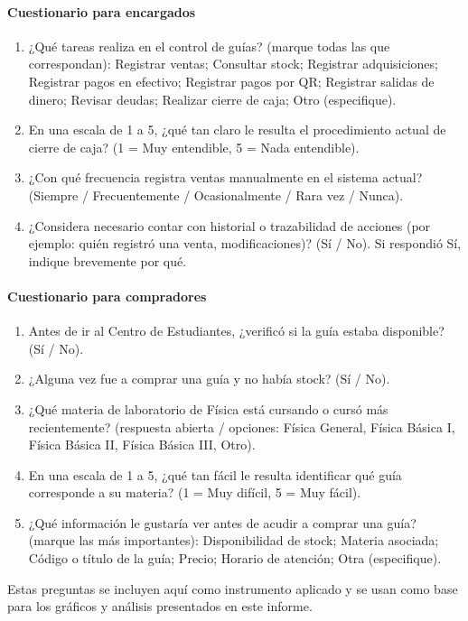 \documentclass[12pt,letterpaper]{article}
\begin{document}
\paragraph{Cuestionario para encargados}
\begin{enumerate}
    \item ¿Qué tareas realiza en el control de guías? (marque todas las que correspondan): Registrar ventas; Consultar stock; Registrar adquisiciones; Registrar pagos en efectivo; Registrar pagos por QR; Registrar salidas de dinero; Revisar deudas; Realizar cierre de caja; Otro (especifique).
    \item En una escala de 1 a 5, ¿qué tan claro le resulta el procedimiento actual de cierre de caja? (1 = Muy entendible, 5 = Nada entendible).
    \item ¿Con qué frecuencia registra ventas manualmente en el sistema actual? (Siempre / Frecuentemente / Ocasionalmente / Rara vez / Nunca).
    \item ¿Considera necesario contar con historial o trazabilidad de acciones (por ejemplo: quién registró una venta, modificaciones)? (Sí / No). Si respondió Sí, indique brevemente por qué.
\end{enumerate}

\paragraph{Cuestionario para compradores}
\begin{enumerate}
    \item Antes de ir al Centro de Estudiantes, ¿verificó si la guía estaba disponible? (Sí / No).
    \item ¿Alguna vez fue a comprar una guía y no había stock? (Sí / No).
    \item ¿Qué materia de laboratorio de Física está cursando o cursó más recientemente? (respuesta abierta / opciones: Física General, Física Básica I, Física Básica II, Física Básica III, Otro).
    \item En una escala de 1 a 5, ¿qué tan fácil le resulta identificar qué guía corresponde a su materia? (1 = Muy difícil, 5 = Muy fácil).
    \item ¿Qué información le gustaría ver antes de acudir a comprar una guía? (marque las más importantes): Disponibilidad de stock; Materia asociada; Código o título de la guía; Precio; Horario de atención; Otra (especifique).
\end{enumerate}

Estas preguntas se incluyen aquí como instrumento aplicado y se usan como base para los gráficos y análisis presentados en este informe.
\end{document}
